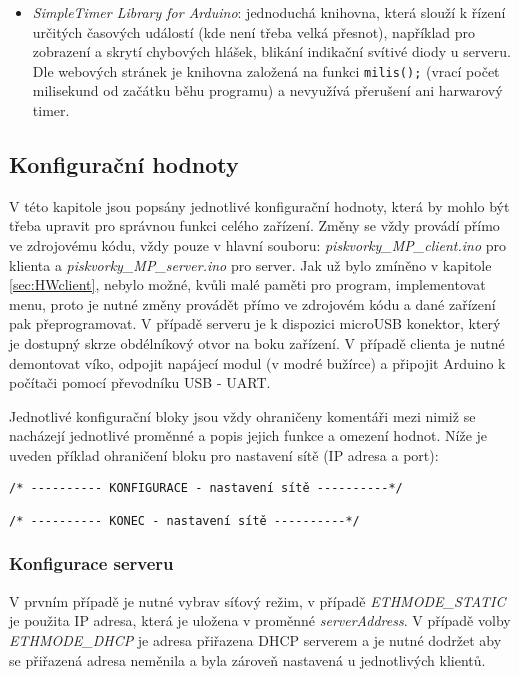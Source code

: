 \begin{itemize}
  \item \textit{SimpleTimer Library for Arduino}: jednoduchá knihovna, která slouží k řízení určitých časových událostí (kde není třeba velká přesnot), například pro zobrazení a skrytí chybových hlášek, blikání indikační svítivé diody u serveru. Dle webových stránek \cite{lib_simpleTimer} je knihovna založená na funkci \texttt{milis();} (vrací počet milisekund od začátku běhu programu) a nevyužívá přerušení ani harwarový timer.
\end{itemize}

\subsection{Konfigurační hodnoty}
V této kapitole jsou popsány jednotlivé konfigurační hodnoty, která by mohlo být třeba upravit pro správnou funkci celého zařízení. Změny se vždy provádí přímo ve zdrojovému kódu, vždy pouze v hlavní souboru: \textit{piskvorky\_MP\_client.ino} pro klienta a \textit{piskvorky\_MP\_server.ino} pro server. Jak už bylo zmíněno v kapitole \ref{sec:HWclient}, nebylo možné, kvůli malé paměti pro program, implementovat menu, proto je nutné změny provádět přímo ve zdrojovém kódu a dané zařízení pak přeprogramovat. V případě serveru je k dispozici microUSB konektor, který je dostupný skrze obdélníkový otvor na boku zařízení. V případě clienta je nutné demontovat víko, odpojit napájecí modul (v modré bužírce) a připojit Arduino k počítači pomocí převodníku USB - UART.

Jednotlivé konfigurační bloky jsou vždy ohraničeny komentáři mezi nimiž se nacházejí jednotlivé proměnné a popis jejich funkce a omezení hodnot. Níže je uveden příklad ohraničení bloku pro nastavení sítě (IP adresa a port):
\begin{verbatim}
/* ---------- KONFIGURACE - nastavení sítě ----------*/

/* ---------- KONEC - nastavení sítě ----------*/
\end{verbatim}


\subsubsection{Konfigurace serveru}
\label{sec:server-nastaveni}
V prvním případě je nutné vybrav síťový režim, v případě \textit{ETHMODE\_STATIC} je použita IP adresa, která je uložena v proměnné \textit{serverAddress}. V případě volby \textit{ETHMODE\_DHCP} je adresa přiřazena DHCP serverem a je nutné dodržet aby se přiřazená adresa neměnila a byla zároveň nastavená u jednotlivých klientů.

